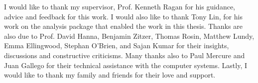 \documentclass[main.tex]{subfiles}
\begin{document}
I would like to thank my supervisor, Prof. Kenneth Ragan for his guidance, advice and feedback for this work. I would also like to thank Tony Lin, for his work on the analysis package that enabled the work in this thesis. Thanks are also due to Prof. David Hanna, Benjamin Zitzer, Thomas Rosin, Matthew Lundy, Emma Ellingwood, Stephan O'Brien, and Sajan Kumar for their insights, discussions and constructive criticisms. Many thanks also to Paul Mercure and Juan Gallego for their technical assistance with the computer systems. Lastly, I would like to thank my family and friends for their love and support.
\end{document}
